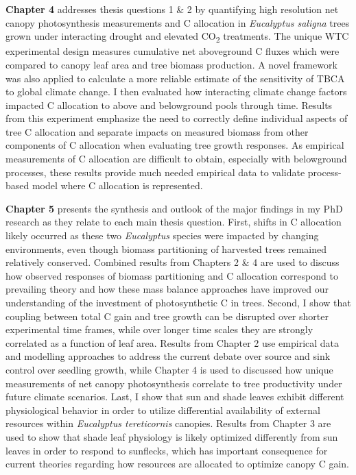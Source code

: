 \documentclass[a4paper]{article}
\begin{document}
\textbf{Chapter 4} addresses thesis questions 1 \& 2 by quantifying high resolution net canopy photosynthesis measurements and C allocation in \textit{Eucalyptus saligna} trees grown under interacting drought and elevated CO\textsubscript{2} treatments. The unique WTC experimental design measures cumulative net aboveground C fluxes which were compared to canopy leaf area and tree biomass production. A novel framework was also applied to calculate a more reliable estimate of the sensitivity of TBCA to global climate change. I then evaluated how interacting climate change factors impacted C allocation to above and belowground pools through time. Results from this experiment emphasize the need to correctly define individual aspects of tree C allocation and separate impacts on measured biomass from other components of C allocation when evaluating tree growth responses. As empirical measurements of C allocation are difficult to obtain, especially with belowground processes, these results provide much needed empirical data to validate process-based model where C allocation is represented. 

\textbf{Chapter 5} presents the synthesis and outlook of the major findings in my PhD research as they relate to each main thesis question. First, shifts in C allocation likely occurred as these two \textit{Eucalyptus} species were impacted by changing environments, even though biomass partitioning of harvested trees remained relatively conserved. Combined results from Chapters 2 \& 4 are used to discuss how observed responses of biomass partitioning and C allocation correspond to prevailing theory and how these mass balance approaches have improved our understanding of the investment of photosynthetic C in trees. Second, I show that coupling between total C gain and tree growth can be disrupted over shorter experimental time frames, while over longer time scales they are strongly correlated as a function of leaf area. Results from Chapter 2 use empirical data and modelling approaches to address the current debate over source and sink control over seedling growth, while Chapter 4 is used to discussed how unique measurements of net canopy photosynthesis correlate to tree productivity under future climate scenarios. Last, I show that sun and shade leaves exhibit different physiological behavior in order to utilize differential availability of external resources within \textit{Eucalyptus tereticornis} canopies. Results from Chapter 3 are used to show that shade leaf physiology is likely optimized differently from sun leaves in order to respond to sunflecks, which has important consequence for current theories regarding how resources are allocated to optimize canopy C gain.
\end{document}

